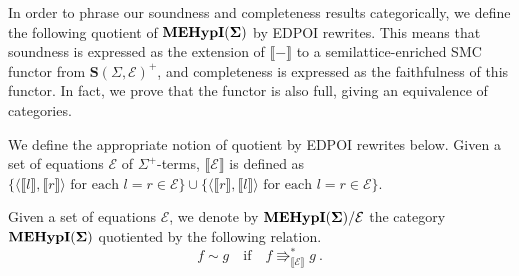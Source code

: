 
In order to phrase our soundness and completeness results categorically,  we define the following quotient of ${\mathbf{MEHypI(\Sigma)}}$ by EDPOI rewrites.  
This means that soundness is expressed as the extension of $\llbracket - \rrbracket$ to a semilattice-enriched SMC functor from $\textbf{S}(\Sigma, \mathcal E)^{+}$,  and completeness is expressed as the faithfulness of this functor.  
In fact,  we prove that the functor is also full,  giving an equivalence of categories. 

We define the appropriate notion of quotient by EDPOI rewrites below.  
Given a set of equations $\mathcal{E}$ of $\Sigma^{+}$-terms, $\llbracket \mathcal{E} \rrbracket$ is defined as $\{\langle \llbracket l \rrbracket, \llbracket r \rrbracket \rangle \text{ for each } l = r \in \mathcal{E} \} \cup \{\langle \llbracket r \rrbracket, \llbracket l \rrbracket \rangle \text{ for each } l = r \in \mathcal{E}\}$.
\begin{definition}  
Given a set of equations $\mathcal{E}$,  we denote by ${\mathbf{MEHypI(\Sigma)}}/\mathcal{E}$ the category ${\mathbf{MEHypI(\Sigma)}}$ quotiented by the following relation. 
\[
	f \sim g \quad \text{if} \quad f \Rrightarrow^{*}_{\llbracket \mathcal E \rrbracket} g ~ . 
\]
\end{definition}

